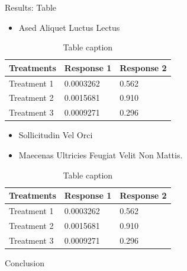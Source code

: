 \documentclass[final,hyperref={pdfpagelabels=false}]{beamer}
\begin{document}
\begin{frame}[t]
\begin{columns}[t]
\begin{column}{.465\textwidth}

\begin{block}{Results: Table}

\begin{itemize}
\item Ased Aliquet Luctus Lectus
\end{itemize}

\begin{table}
\begin{tabular}{l l l}
\toprule
\textbf{Treatments} & \textbf{Response 1} & \textbf{Response 2}\\
\midrule
Treatment 1 & 0.0003262 & 0.562 \\
Treatment 2 & 0.0015681 & 0.910 \\
Treatment 3 & 0.0009271 & 0.296 \\
\bottomrule
\end{tabular}
\caption{Table caption}
\end{table}

\begin{itemize}
\item Sollicitudin Vel Orci
\item Maecenas Ultricies Feugiat Velit Non Mattis.
\end{itemize}

\begin{table}
\begin{tabular}{l l l}
\toprule
\textbf{Treatments} & \textbf{Response 1} & \textbf{Response 2}\\
\midrule
Treatment 1 & 0.0003262 & 0.562 \\
Treatment 2 & 0.0015681 & 0.910 \\
Treatment 3 & 0.0009271 & 0.296 \\
\bottomrule
\end{tabular}
\caption{Table caption}
\end{table}
     
\end{block}



\begin{block}{Conclusion}


\end{block}
\end{column}
\end{columns}
\end{frame}
\end{document}
